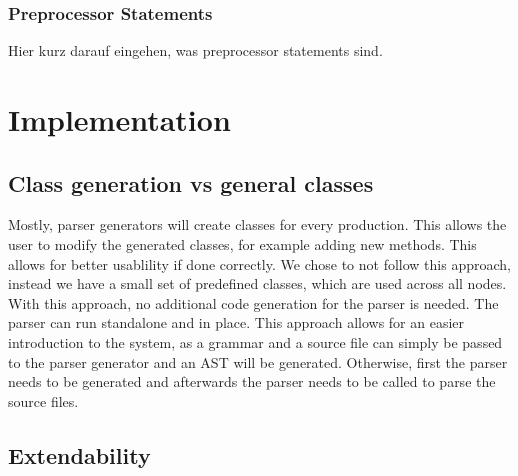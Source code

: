 %
%





\subsubsection{Preprocessor Statements}

Hier kurz darauf eingehen, was preprocessor statements sind.

\section{Implementation}

\subsection{Class generation vs general classes}

Mostly, parser generators will create classes for every production. This allows the user to modify the generated classes, for example adding new methods. This allows for better usablility if done correctly. We chose to not follow this approach, instead we have a small set of predefined classes, which are used across all nodes. With this approach, no additional code generation for the parser is needed. The parser can run standalone and in place. This approach allows for an easier introduction to the system, as a grammar and a source file can simply be passed to the parser generator and an AST will be generated. Otherwise, first the parser needs to be generated and afterwards the parser needs to be called to parse the source files.

\subsection{Extendability}


